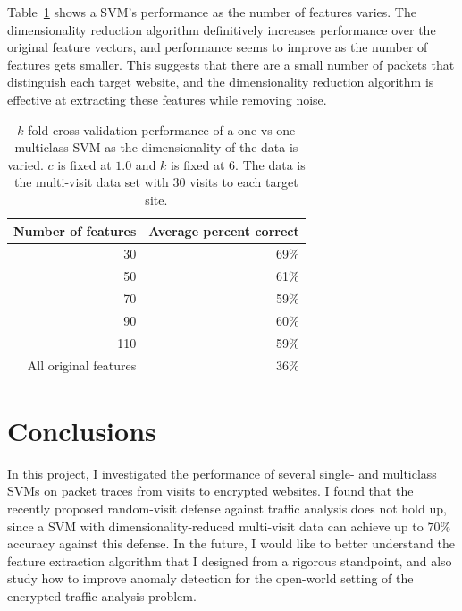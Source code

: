 \documentclass[10pt, twocolumn]{article}
\begin{document}
Table~\ref{tab:dimred-kfold} shows a SVM's performance as the number of features varies. The dimensionality 
reduction algorithm definitively increases performance over the original feature vectors, and performance 
seems to improve as the number of features gets smaller. This suggests that there are a small number of 
packets that distinguish each target website, and the dimensionality reduction algorithm is effective at 
extracting these features while removing noise.

\begin{table}
\caption{$k$-fold cross-validation performance of a one-vs-one multiclass SVM as the dimensionality of 
the data is varied. $c$ is fixed at $1.0$ and $k$ is fixed at $6$. The data is the multi-visit data set 
with 30 visits to each target site.}
\begin{center}
\begin{tabular}{|r|r|}
\hline
Number of features & Average percent correct \\
\hline
30 & 69\% \\
\hline
50 & 61\% \\
\hline
70 & 59\% \\
\hline
90 & 60\% \\
\hline
110 & 59\% \\
\hline
All original features & 36\% \\ \hline
\end{tabular}
\end{center}
\label{tab:dimred-kfold}
\end{table}%

\section{Conclusions}

In this project, I investigated the performance of several single- and multiclass SVMs on packet traces from visits to encrypted websites. 
I found that the recently proposed random-visit defense against traffic analysis does not hold up, since a SVM with 
dimensionality-reduced multi-visit data can achieve up to $70\%$ accuracy against this defense. In the future, I would like to better 
understand the feature extraction algorithm that I designed from a rigorous standpoint, and also study how to improve anomaly detection 
for the open-world setting of the encrypted traffic analysis problem.




\end{document}
